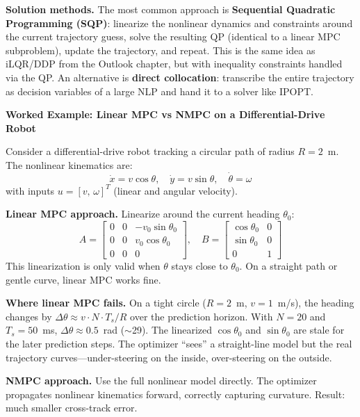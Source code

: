 \textbf{Solution methods.} The most common approach is \textbf{Sequential Quadratic Programming (SQP)}: linearize the nonlinear dynamics and constraints around the current trajectory guess, solve the resulting QP (identical to a linear MPC subproblem), update the trajectory, and repeat. This is the same idea as iLQR/DDP from the Outlook chapter, but with inequality constraints handled via the QP. An alternative is \textbf{direct collocation}: transcribe the entire trajectory as decision variables of a large NLP and hand it to a solver like IPOPT.

\vspace{0.5em}
\begin{mdframed}[linewidth=1pt, innertopmargin=10pt, innerbottommargin=10pt]
\textbf{Worked Example: Linear MPC vs NMPC on a Differential-Drive Robot}

\vspace{0.3em}
Consider a differential-drive robot tracking a circular path of radius $R = 2$~m. The nonlinear kinematics are:
\[
\dot{x} = v\cos\theta, \quad \dot{y} = v\sin\theta, \quad \dot{\theta} = \omega
\]
with inputs $u = [v,\, \omega]^T$ (linear and angular velocity).

\textbf{Linear MPC approach.} Linearize around the current heading $\theta_0$:
\[
A = \begin{bmatrix} 0 & 0 & -v_0 \sin\theta_0 \\ 0 & 0 & v_0 \cos\theta_0 \\ 0 & 0 & 0 \end{bmatrix}, \quad
B = \begin{bmatrix} \cos\theta_0 & 0 \\ \sin\theta_0 & 0 \\ 0 & 1 \end{bmatrix}
\]
This linearization is only valid when $\theta$ stays close to $\theta_0$. On a straight path or gentle curve, linear MPC works fine.

\textbf{Where linear MPC fails.} On a tight circle ($R = 2$~m, $v = 1$~m/s), the heading changes by $\Delta\theta \approx v \cdot N \cdot T_s / R$ over the prediction horizon. With $N = 20$ and $T_s = 50$~ms, $\Delta\theta \approx 0.5$~rad ($\sim$29\textdegree). The linearized $\cos\theta_0$ and $\sin\theta_0$ are stale for the later prediction steps. The optimizer ``sees'' a straight-line model but the real trajectory curves---under-steering on the inside, over-steering on the outside.

\textbf{NMPC approach.} Use the full nonlinear model directly. The optimizer propagates nonlinear kinematics forward, correctly capturing curvature. Result: much smaller cross-track error.


\end{mdframed}
